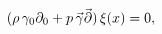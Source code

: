 \begin{equation}
(\rho\,\gamma_0\partial_0+p\,\vec\gamma\vec{\mspace{.5mu}\partial})
\,\xi(x)=0,
\end{equation}

